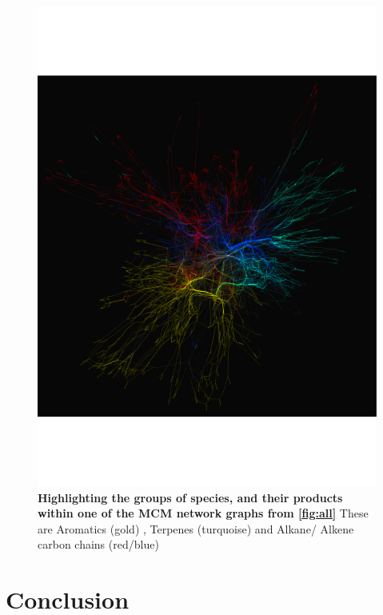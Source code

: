     \begin{figure}[H]
         \centering
    \includegraphics[width=\textwidth,trim={0 4cm 0 4cm},angle=-90]{figures_c1/beijingtest/graphgroups.pdf}
     \caption{\textbf{Highlighting the groups of species, and their products within one of the MCM network graphs from \autoref{fig:all}} These are {\color{DarkGoldenrod} Aromatics (gold)} , {\color{DarkTurquoise} Terpenes (turquoise) } and {\color{OrangeRed} Alkane}/{\color{RoyalBlue} Alkene  } carbon chains (red/blue)}
     \label{fig:fncolour}
     \end{figure}





\section{Conclusion}

